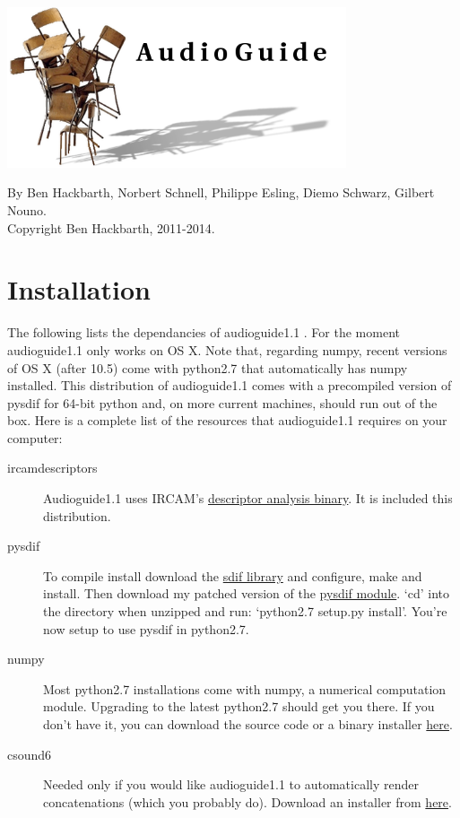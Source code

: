 \documentclass{article}
\newcommand{\ag}{audioguide1.1 }
\newcommand{\Ag}{Audioguide1.1 }
\begin{document}
\setlength{\parskip}{10pt}
\begin{spacing}{1.2}
\begin{center}
\includegraphics[width=0.75\textwidth]{image0.png}

By Ben Hackbarth, Norbert Schnell, Philippe Esling, Diemo Schwarz, Gilbert Nouno. \\
Copyright Ben Hackbarth, 2011-2014.
\end{center}

\tableofcontents


\section{Installation}
The following lists the dependancies of \ag.  For the moment \ag only works on OS X.  Note that, regarding numpy, recent versions of OS X  (after 10.5) come with python2.7 that automatically has numpy installed.  This distribution of \ag comes with a precompiled version of pysdif for 64-bit python and, on more current machines, should run out of the box.  Here is a complete list of the resources that \ag requires on your computer:
\begin{description}
\item[ircamdescriptors] \Ag uses IRCAM's \href{http://www.ircam.fr/1041.html?&L=1}{descriptor analysis binary}.  It is included this distribution.
\item[pysdif] To compile install download the \href{http://sourceforge.net/projects/sdif/files/sdif/}{sdif library} and configure, make and install.  Then download my patched version of the \href{http://www.benhackbarth.com/\ag/pysdif-0.1.4-patch.zip}{pysdif module}.  `cd' into the directory when unzipped and run: `python2.7 setup.py install'.  You're now setup to use pysdif in python2.7.
\item[numpy] Most python2.7 installations come with numpy, a numerical computation module.  Upgrading to the latest python2.7 should get you there.  If you don't have it, you can download the source code or a binary installer \href{http://www.scipy.org/install.html}{here}.
\item[csound6] Needed only if you would like \ag to automatically render concatenations (which you probably do).  Download an installer from \href{http://www.csounds.com/downloads}{here}.
\end{description}


\end{spacing}
\end{document}
